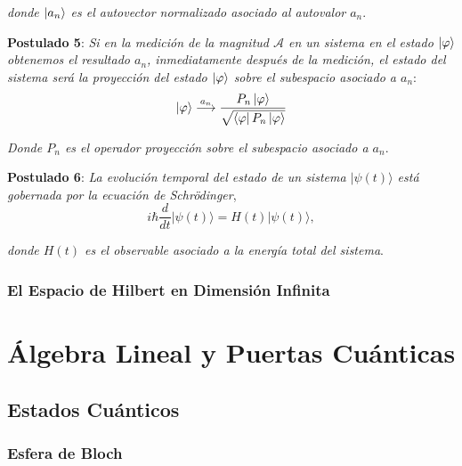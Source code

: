 \documentclass{article}
\numberwithin{equation}{section} %
\begin{document}
    \textit{donde \( \ket{a_{n}} \) es el autovector normalizado asociado al autovalor \( a_{n} \)}.
    
    \vspace{5mm}

    \textbf{Postulado 5}: \textit{Si en la medición de la magnitud \( \mathcal{A} \) en un sistema en el estado \( \ket{\varphi} \) obtenemos el resultado \( a_{n} \), inmediatamente después de la medición, el estado del sistema será la proyección del estado \( \ket{\varphi} \) sobre el subespacio asociado a \( a_{n} \)}:
    \begin{equation}
        \ket{\varphi} \overset{a_{n}}{\longrightarrow} \frac{P_{n} \ket{\varphi}}{\sqrt{\bra{\varphi} P_{n} \ket{\varphi}}}
    \end{equation}

    \vspace{2mm}
    \textit{Donde \( P_{n} \) es el operador proyección sobre el subespacio asociado a \( a_{n} \)}.
    
    \vspace{5mm}

    \textbf{Postulado 6}: \textit{La evolución temporal del estado de un sistema \( |\psi(t)\rangle \) está gobernada por la ecuación de Schrödinger},
    \begin{equation}
        i\hbar \frac{d}{dt} |\psi(t)\rangle = H(t) |\psi(t)\rangle,
        \label{eq:schrodinger}
    \end{equation}
    
    \textit{donde \( H(t) \) es el observable asociado a la energía total del sistema}.
    
    \vspace{5mm}





    \subsubsection{El Espacio de Hilbert en Dimensión Infinita}

    \section{Álgebra Lineal y Puertas Cuánticas}
    \subsection{Estados Cuánticos}
    \subsubsection{Esfera de Bloch}    
\end{document}
